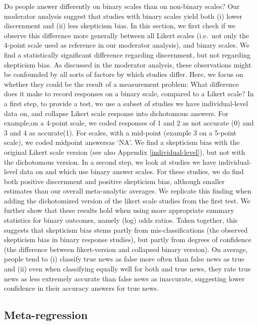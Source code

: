 \documentclass[
  doc,floatsintext]{apa6}
\begin{document}
Do people answer differently on binary scales than on non-binary scales? Our moderator analysis suggest that studies with binary scales yield both (i) lower discernment and (ii) less skepticism bias. In this section, we first check if we observe this difference more generally between all Likert scales (i.e.~not only the 4-point scale used as reference in our moderator analysis), and binary scales. We find a statistically significant difference regarding discernment, but not regarding skepticism bias. As discussed in the moderator analysis, these observations might be confounded by all sorts of factors by which studies differ. Here, we focus on whether they could be the result of a measurement problem: What difference does it make to record responses on a binary scale, compared to a Likert scale? In a first step, to provide a test, we use a subset of studies we have individual-level data on, and collapse Likert scale response into dichotomous answers. For example,on a 4-point scale, we coded responses of 1 and 2 as not accurate (0) and 3 and 4 as accurate(1). For scales, with a mid-point (example 3 on a 5-point scale), we coded midpoint answersas `NA'. We find a skepticism bias with the original Likert scale version (see also Appendix \ref{individual-level}), but not with the dichotomous version. In a second step, we look at studies we have individual-level data on and which use binary answer scales. For these studies, we do find both positive discernment and positive skepticism bias, although smaller estimates than our overall meta-analytic averages. We replicate this finding when adding the dichotomized version of the likert scale studies from the first test. We further show that these results hold when using more appropriate summary statistics for binary outcomes, namely (log) odds ratios. Taken together, this suggests that skepticism bias stems partly from mis-classifications (the observed skepticism bias in binary response studies), but partly from degrees of confidence (the difference between likert-version and collapsed binary version). On average, people tend to (i) classify true news as false more often than false news as true and (ii) even when classifying equally well for both and true news, they rate true news as less extremely accurate than false news as inaccurate, suggesting lower confidence in their accuracy answers for true news.

\subsection{Meta-regression}\label{meta-regression}
\end{document}
